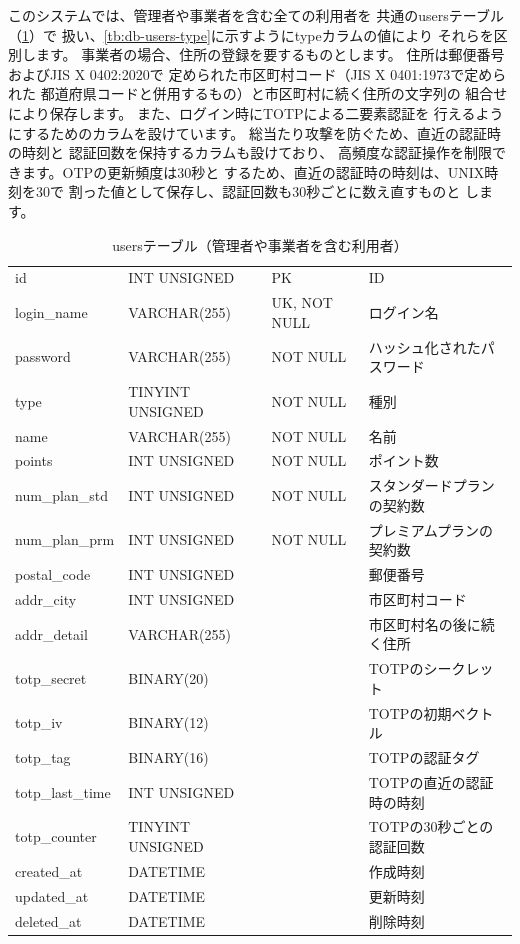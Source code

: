 \documentclass{docs}
\begin{document}
このシステムでは、管理者や事業者を含む全ての利用者を
共通のusersテーブル（\cref{tb:db-users}）で
扱い、\cref{tb:db-users-type}に示すようにtypeカラムの値により
それらを区別します。
事業者の場合、住所の登録を要するものとします。
住所は郵便番号およびJIS X 0402:2020で
定められた市区町村コード（JIS X 0401:1973で定められた
都道府県コードと併用するもの）と市区町村に続く住所の文字列の
組合せにより保存します。
また、ログイン時にTOTPによる二要素認証を
行えるようにするためのカラムを設けています。
総当たり攻撃を防ぐため、直近の認証時の時刻と
認証回数を保持するカラムも設けており、
高頻度な認証操作を制限できます。OTPの更新頻度は30秒と
するため、直近の認証時の時刻は、UNIX時刻を30で
割った値として保存し、認証回数も30秒ごとに数え直すものと
します。
\begin{table}[H]
	\centering
	\caption{usersテーブル（管理者や事業者を含む利用者）}\label{tb:db-users}
	\begin{tabular}{|l|l|l|l|}
		\hline
		\thead{カラム名} & \thead{データ型} & \thead{制約} & \thead{説明} \\ \hline
		id & INT UNSIGNED & PK & ID \\ \hline
		login\_name & VARCHAR(255) & UK, NOT NULL & ログイン名 \\ \hline
		password & VARCHAR(255) & NOT NULL & ハッシュ化されたパスワード \\ \hline
		type & TINYINT UNSIGNED & NOT NULL & 種別 \\ \hline
		name & VARCHAR(255) & NOT NULL & 名前 \\ \hline
		points & INT UNSIGNED & NOT NULL & ポイント数 \\ \hline
		num\_plan\_std & INT UNSIGNED & NOT NULL & スタンダードプランの契約数 \\ \hline
		num\_plan\_prm & INT UNSIGNED & NOT NULL & プレミアムプランの契約数 \\ \hline
		postal\_code & INT UNSIGNED & & 郵便番号 \\ \hline
		addr\_city & INT UNSIGNED & & 市区町村コード \\ \hline
		addr\_detail & VARCHAR(255) & & 市区町村名の後に続く住所 \\ \hline
		totp\_secret & BINARY(20) & & TOTPのシークレット \\ \hline
		totp\_iv & BINARY(12) & & TOTPの初期ベクトル \\ \hline
		totp\_tag & BINARY(16) & & TOTPの認証タグ \\ \hline
		totp\_last\_time & INT UNSIGNED & & TOTPの直近の認証時の時刻 \\ \hline
		totp\_counter & TINYINT UNSIGNED & & TOTPの30秒ごとの認証回数 \\ \hline
		created\_at & DATETIME & & 作成時刻 \\ \hline
		updated\_at & DATETIME & & 更新時刻 \\ \hline
		deleted\_at & DATETIME & & 削除時刻 \\ \hline
	\end{tabular}
\end{table}
\end{document}
